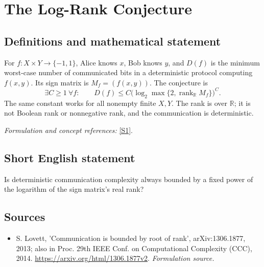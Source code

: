 \documentclass[11pt]{article}
\begin{document}
\section*{\texorpdfstring{The Log-Rank Conjecture}{The Log-Rank Conjecture}}\label{statement}
\subsection{Definitions and mathematical statement}
For $f:X\times Y\to\{-1,1\}$, Alice knows $x$, Bob knows $y$, and $D(f)$ is the minimum worst-case number of communicated bits in a deterministic protocol computing $f(x,y)$. Its sign matrix is $M_f=(f(x,y))$. The conjecture is
\[
 \exists C\ge1\ \forall f:\qquad
 D(f)\le C\bigl(\log_2\max\{2,\operatorname{rank}_{{\mathbb{R}}}M_f\}\bigr)^C.
\]
The same constant works for all nonempty finite $X,Y$. The rank is over ${\mathbb{R}}$; it is not Boolean rank or nonnegative rank, and the communication is deterministic.
\par\smallskip\textit{Formulation and concept references:} \href{https://arxiv.org/html/1306.1877v2}{[S1]}.

\subsection{Short English statement}
Is deterministic communication complexity always bounded by a fixed power of the logarithm of the sign matrix's real rank?
\subsection{Sources}
\begin{itemize}
\item[S1]S. Lovett, 'Communication is bounded by root of rank', arXiv:1306.1877, 2013; also in Proc. 29th IEEE Conf. on Computational Complexity (CCC), 2014.
\url{https://arxiv.org/html/1306.1877v2}.
\textit{Formulation source.}
\end{itemize}
\end{document}
